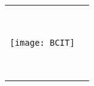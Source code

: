 \begin{titlepage}
\null\vfill
\begin{center}
\large
\sffamily

\bigskip

{\Large\spacedlowsmallcaps{\myName}} \\

\bigskip

{\huge\spacedlowsmallcaps{\myTitle} \\
}

\bigskip
    
\vspace{9cm}

\begin{tabular} {cc}
	\parbox{0.4\textwidth}{\texttt{[image: BCIT]}}
	&
	\parbox{0.6\textwidth}{{\Large\spacedlowsmallcaps{\mySubTitle}} \\ 
	
						{\normalsize
						
						\myGroup \\
						\myUrl \\
						\myTime}}
\end{tabular}
\end{center}
\vfill
\end{titlepage}



